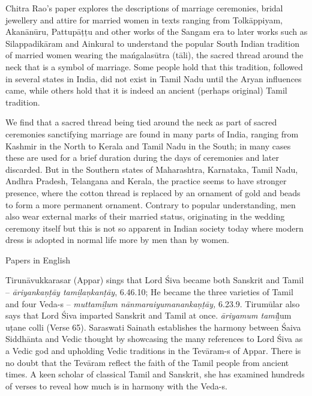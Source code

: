 Chitra Rao’s paper explores the descriptions of marriage ceremonies, bridal jewellery and attire for married women in texts ranging from Tolkāppiyam, Akanānūru, Pattupāṭṭu and other works of the Sangam era to later works such as Silappadikāram and Ainkural to understand the popular South Indian tradition of married women wearing the mańgalasūtra (tāli), the sacred thread around the neck that is a symbol of marriage. Some people hold that this tradition, followed in several states in India, did not exist in Tamil Nadu until the Aryan influences came, while others hold that it is indeed an ancient (perhaps original) Tamil tradition.

We find that a sacred thread being tied around the neck as part of sacred ceremonies sanctifying marriage are found in many parts of India, ranging from Kashmir in the North to Kerala and Tamil Nadu in the South; in many cases these are used for a brief duration during the days of ceremonies and later discarded. But in the Southern states of Maharashtra, Karnataka, Tamil Nadu, Andhra Pradesh, Telangana and Kerala, the practice seems to have stronger presence, where the cotton thread is replaced by an ornament of gold and beads to form a more permanent ornament. Contrary to popular understanding, men also wear external marks of their married status, originating in the wedding ceremony itself but this is not so apparent in Indian society today where modern dress is adopted in normal life more by men than by women.

Papers in English

Tirunāvukkarasar (Appar) sings that Lord Śiva became both Sanskrit and Tamil – \textit{āriyankaņṭāy tamiḻaņkanṭāy}, 6.46.10; He became the three varieties of Tamil and four Veda-s -- \textit{muttamiḻum nānmaraiyumanankaņ\break ṭāy,} 6.23.9. Tirumūlar also says that Lord Śiva imparted Sanskrit and Tamil at once. \textit{āriyamum tami}ḻum uṭane colli (Verse 65). Saraswati Sainath establishes the harmony between Śaiva Siddhānta and Vedic thought by showcasing the many references to Lord Śiva as a Vedic god and upholding Vedic traditions in the Tevāram-s of Appar. There is no doubt that the Tevāram reflect the faith of the Tamil people from ancient times. A keen scholar of classical Tamil and Sanskrit, she has examined hundreds of verses to reveal how much is in harmony with the Veda-s.

